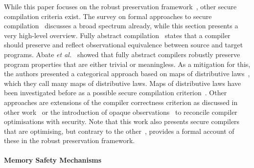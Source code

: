 \documentclass[acmsmall]{acmart}
\theoremstyle{definition}
\begin{document}
While this paper focuses on the robust preservation framework~\cite{abate2019jour}, other secure compilation criteria exist.
The survey on formal approaches to secure compilation~\cite{patrignani2019survey} discusses a broad spectrum already, while this section presents a very high-level overview.
Fully abstract compilation~\cite{abadi1999fullabstraction} states that a compiler should preserve and reflect observational equivalence between source and target programs.
Abate \emph{et al.}~\cite{abate2021faandrc} showed that fully abstract compilers robustly preserve program properties that are either trivial or meaningless.
As a mitigation for this, the authors presented a categorical approach based on maps of distributive laws~\cite{watanabe2002modl}, which they call many maps of distributive laws.
Maps of distributive laws have been investigated before as a possible secure compilation criterion~\cite{tsampas2020catsc}.
Other approaches are extensions of the compiler correctness criterion as discussed in other work~\cite{patterson2019next700} or the introduction of opaque observations~\cite{vu2021reconciling} to reconcile compiler optimisations with security.
Note that this work also presents secure compilers that are optimising, but contrary to the other~\cite{vu2021reconciling}, provides a formal account of these in the robust preservation framework.

\paragraph*{Memory Safety Mechanisms}\label{subsec:relw:msmechs}
\end{document}
